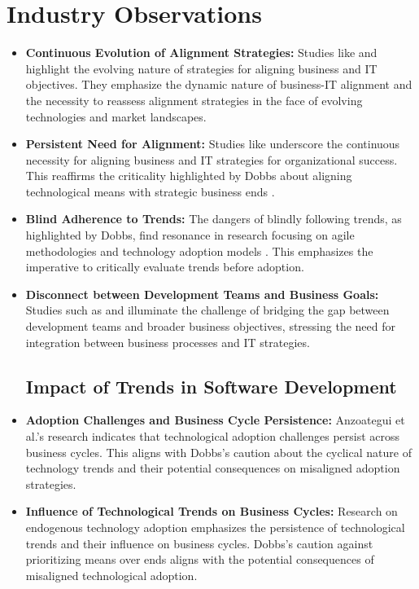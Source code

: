 \documentclass[a4Paper]{article}
\begin{document}
\section{Industry Observations}
\begin{itemize}
    \subsection{Technology Adoption and Business Alignment}
    \item \textbf{Continuous Evolution of Alignment Strategies:} Studies like \cite{ullah2011modeling} and \cite{parthasarthy2018impact} highlight the evolving nature of strategies for aligning business and IT objectives. They emphasize the dynamic nature of business-IT alignment and the necessity to reassess alignment strategies in the face of evolving technologies and market landscapes.
    \item \textbf{Persistent Need for Alignment:} Studies like \cite{ilmudeen2019does} underscore the continuous necessity for aligning business and IT strategies for organizational success. This reaffirms the criticality highlighted by Dobbs about aligning technological means with strategic business ends \cite{al2020impact}.
    \item \textbf{Blind Adherence to Trends:} The dangers of blindly following trends, as highlighted by Dobbs, find resonance in research focusing on agile methodologies \cite{abrahamsson2017agile} and technology adoption models \cite{dube2020review}. This emphasizes the imperative to critically evaluate trends before adoption.
    \item \textbf{Disconnect between Development Teams and Business Goals:} Studies such as \cite{hayat2019influence} and \cite{rahimi2016business} illuminate the challenge of bridging the gap between development teams and broader business objectives, stressing the need for integration between business processes and IT strategies.
    \subsection{Impact of Trends in Software Development}
    \item \textbf{Adoption Challenges and Business Cycle Persistence:} Anzoategui et al.'s research \cite{anzoategui2019endogenous} indicates that technological adoption challenges persist across business cycles. This aligns with Dobbs's caution about the cyclical nature of technology trends and their potential consequences on misaligned adoption strategies.
    \item \textbf{Influence of Technological Trends on Business Cycles:} Research on endogenous technology adoption \cite{anzoategui2019endogenous} emphasizes the persistence of technological trends and their influence on business cycles. Dobbs's caution against prioritizing means over ends aligns with the potential consequences of misaligned technological adoption.

\end{itemize}
\end{document}

